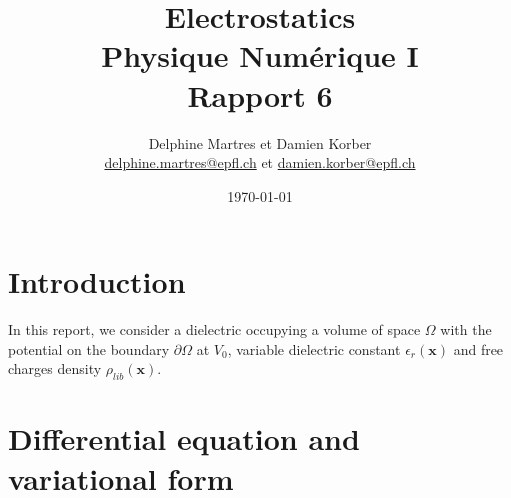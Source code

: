 \documentclass[a4paper,12pt,twoside]{article}
\newcommand{\mail}[1]{{\href{mailto:#1}{#1}}}
\begin{document}
\title{Electrostatics\\{\small Physique Numérique I}\\{\small Rapport 6}}
\date{\today}
\author{Delphine Martres et Damien Korber\\{\small \mail{delphine.martres@epfl.ch} et \mail{damien.korber@epfl.ch}}}

\maketitle
\tableofcontents %


\baselineskip=16pt
\parindent=15pt
\parskip=5pt
\newpage



\section{Introduction}
In this report, we consider a dielectric occupying a volume of space $\Omega$ with the potential on the boundary $\partial\Omega$ at $V_0$, variable dielectric constant $\epsilon_r(\mathbf{x})$ and free charges density $\rho_{lib}(\mathbf{x})$.

\section{Differential equation and variational form}
\end{document}
